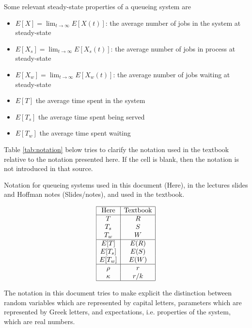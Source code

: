 \documentclass{article}
\newcommand{\utilization}{\rho}
\begin{document}

Some relevant steady-state properties of a queueing system are 
\begin{itemize}
\item $E[X] = \lim_{t\to\infty} E[X(t)]$:     the average number of jobs in the system at steady-state
\item $E[X_s] = \lim_{t\to\infty} E[X_s(t)]$: the average number of jobs in process at steady-state
\item $E[X_w] = \lim_{t\to\infty} E[X_w(t)]$: the average number of jobs waiting at steady-state
\item $E[T]$ the average time spent in the system
\item $E[T_s]$ the average time spent being served
\item $E[T_w]$ the average time spent waiting
\end{itemize}

Table \ref{tab:notation} below tries to clarify the notation used in the textbook relative to the notation presented here. If the cell is blank, then the notation is not introduced in that source. 

\begin{table}[h]
\caption{Notation for queueing systems used in this document (Here), in the lectures slides and Hoffman notes (Slides/notes), and used in the textbook.}
\label{tab:notation}
\[ \begin{array}{|c|c|}
\hline
\mbox{Here} & \mbox{Textbook} \\
\hline
T & R \\
T_s & S \\
T_w & W \\
\hline
E[T] & E(R) \\
E[T_s]  & E(S)\\
E[T_w] & E(W) \\
\hline
\utilization & r \\
\kappa & r/k \\
\hline
\end{array} \]
\end{table}

The notation in this document tries to make explicit the distinction between random variables which are represented by capital letters, parameters which are represented by Greek letters, and expectations, i.e. properties of the system, which are real numbers. 
\end{document}
